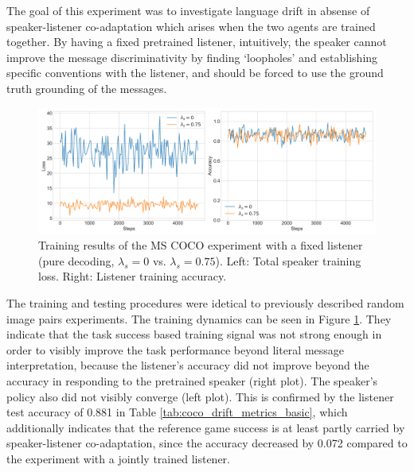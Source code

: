 The goal of this experiment was to investigate language drift in absense of speaker-listener co-adaptation which arises when the two agents are trained together. By having a fixed pretrained listener, intuitively, the speaker cannot improve the message discriminativity by finding `loopholes' and establishing specific conventions with the listener, and should be forced to use the ground truth grounding of the messages.

\begin{figure}
	\centering
	\includegraphics[width=\linewidth]{images/coco_fixedListener_baseline_random_0_075_losses.png}
	\caption{Training results of the MS COCO experiment with a fixed listener (pure decoding, $\lambda_s=0$ vs. $\lambda_s=0.75$). Left: Total speaker training loss. Right: Listener training accuracy.}
	\label{fig:coco_fixed_listener_speaker_loss_listener_acc_075}
\end{figure}

The training and testing procedures were idetical to previously described random image pairs experiments. The training dynamics can be seen in Figure \ref{fig:coco_fixed_listener_speaker_loss_listener_acc_075}. They indicate that the task success based training signal was not strong enough in order to visibly improve the task performance beyond literal message interpretation, because the listener's accuracy did not improve beyond the accuracy in responding to the pretrained speaker (right plot). The speaker's policy also did not visibly converge (left plot). 
This is confirmed by the listener test accuracy of 0.881 in Table \ref{tab:coco_drift_metrics_basic}, which additionally indicates that the reference game success is at least partly carried by speaker-listener co-adaptation, since the accuracy decreased by 0.072 compared to the experiment with a jointly trained listener. 

